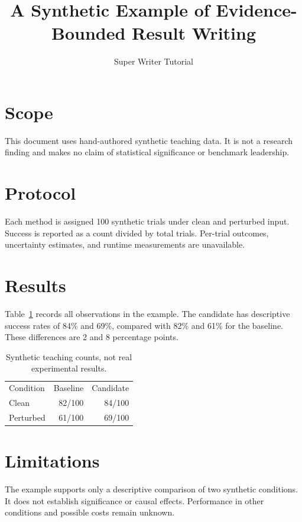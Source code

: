 \documentclass{article}
\title{A Synthetic Example of Evidence-Bounded Result Writing}
\author{Super Writer Tutorial}
\date{}
\begin{document}
\maketitle
\section{Scope}
This document uses hand-authored synthetic teaching data. It is not a research
finding and makes no claim of statistical significance or benchmark leadership.
\section{Protocol}
Each method is assigned 100 synthetic trials under clean and perturbed input.
Success is reported as a count divided by total trials. Per-trial outcomes,
uncertainty estimates, and runtime measurements are unavailable.
\section{Results}
Table~\ref{tab:synthetic} records all observations in the example. The candidate
has descriptive success rates of 84\% and 69\%, compared with 82\% and 61\%
for the baseline. These differences are 2 and 8 percentage points.
\begin{table}[ht]
\centering
\begin{tabular}{lrr}
Condition & Baseline & Candidate \\
Clean & 82/100 & 84/100 \\
Perturbed & 61/100 & 69/100 \\
\end{tabular}
\caption{Synthetic teaching counts, not real experimental results.}
\label{tab:synthetic}
\end{table}
\section{Limitations}
The example supports only a descriptive comparison of two synthetic conditions.
It does not establish significance or causal effects. Performance in other
conditions and possible costs remain unknown.
\end{document}
